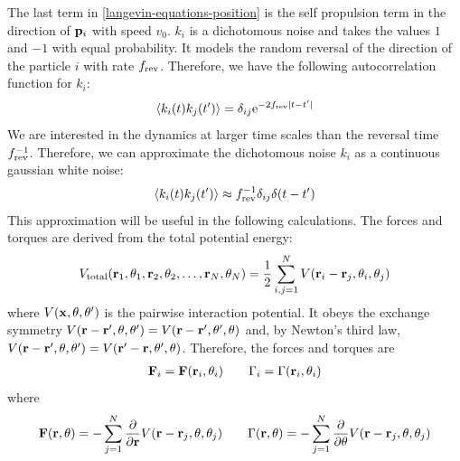 \documentclass[a5paper]{article}
\begin{document}
The last term in \cref{langevin-equations-position} is the self propulsion term in the direction of $\mathbf{p}_i$ with speed $v_0$. $k_i$ is a dichotomous noise and takes the values $1$ and $-1$ with equal probability. It models the random reversal of the direction of the particle $i$ with rate $f_{\rm rev}$. Therefore, we have the following autocorrelation function for $k_i$:
\begin{equation}
    \label{k-autocorrelation}
    \left\langle k_i(t) k_j(t') \right\rangle = \delta_{ij}\mathrm{e}^{-2 f_{\rm rev} |t-t'|}
\end{equation}
We are interested in the dynamics at larger time scales than the reversal time $f_{\rm rev}^{-1}$. Therefore, we can approximate the dichotomous noise $k_i$ as a continuous gaussian white noise:
\begin{equation}
    \label{k-approximation}
    \left\langle k_i(t) k_j(t') \right\rangle \approx f_{\rm rev}^{-1} \delta_{ij} \delta(t-t')
\end{equation}
This approximation will be useful in the following calculations.
The forces and torques are derived from the total potential energy:
\begin{align}
    V_\text{total}(\mathbf{r}_1, \theta_1, \mathbf{r}_2, \theta_2, \ldots, \mathbf{r}_N, \theta_N) = \frac{1}{2}\sum_{i,j=1}^N V(\mathbf{r}_i-\mathbf{r}_j, \theta_i, \theta_j)
\end{align}
where $V(\mathbf{x}, \theta, \theta')$ is the pairwise interaction potential. It obeys the exchange symmetry $V(\mathbf{r}-\mathbf{r}',\theta, \theta') = V(\mathbf{r}-\mathbf{r}',\theta', \theta)$ and, by Newton's third law, $V(\mathbf{r}-\mathbf{r}',\theta, \theta') = V(\mathbf{r}'-\mathbf{r},\theta', \theta)$.
Therefore, the forces and torques are
\begin{align}\label{F-field-def}
    \mathbf{F}_i = \mathbf{F}(\mathbf{r}_i, \theta_i) \qquad \Gamma_i = \Gamma(\mathbf{r}_i, \theta_i)
\end{align}
where
\begin{align}
    \label{F-definition}
    \mathbf{F}(\mathbf{r},\theta) = -\sum_{j=1}^{N}
    \frac{\partial }{\partial \mathbf{r}} V(\mathbf{r}-\mathbf{r}_j, \theta, \theta_j)
    \qquad
    \Gamma(\mathbf{r},\theta) = -\sum_{j=1}^{N}
    \frac{\partial }{\partial \theta} V(\mathbf{r}-\mathbf{r}_j, \theta, \theta_j)
\end{align}
\end{document}
